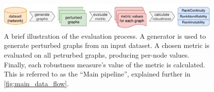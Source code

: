 \begin{figure}[ht]
    \includegraphics[width=\linewidth]{brief_pipeline.pdf}
    \caption{A brief illustration of the evaluation process.
    A generator is used to generate perturbed graphs from an input dataset.
    A chosen metric is evaluated on all petrurbed graphs, producing per-node values.
    Finally, each robustness measure's value of the metric is calculated.
    This is referred to as the ``Main pipeline'', explained further in \cref{fig:main_data_flow}.}
    \label{fig:brief_pipeline}
\end{figure}
